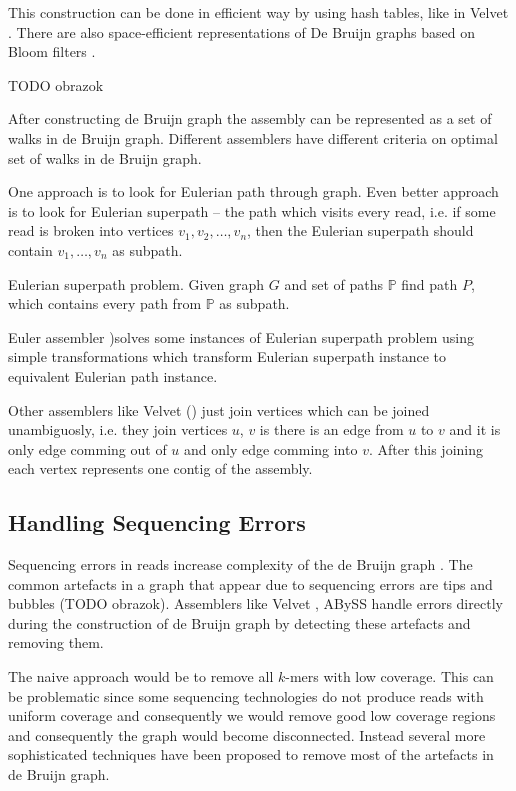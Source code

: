 This construction can be done in efficient way by using hash tables, like in Velvet \citep{Velvet}.
There are also space-efficient representations of De Bruijn graphs based on Bloom filters \citep{minia}.

TODO obrazok

After constructing de Bruijn graph the assembly can be represented
as a set of walks in de Bruijn graph. Different assemblers
have different criteria on optimal set of walks in de Bruijn graph. 

One approach is to look for Eulerian path through graph.
Even better approach is to look for
Eulerian superpath -- the path which visits every read, i.e. if some read
is broken into vertices $v_1, v_2, \dots, v_n$, then the Eulerian superpath
should contain $v_1, \dots, v_n$ as subpath.

\begin{definition}{Eulerian superpath problem.}
Given graph $G$ and set of paths $\mathbb{P}$ find path $P$, which contains
every path from $\mathbb{P}$ as subpath.
\end{definition}

Euler assembler \citep{pevzner2001eulerian})solves some instances of Eulerian superpath problem
using simple transformations which transform Eulerian superpath instance to equivalent Eulerian path instance.

Other assemblers like Velvet (\cite{Velvet}) just join vertices which can be joined
unambiguosly, i.e. they join vertices $u$, $v$ is there is an edge from $u$ to $v$ and
it is only edge comming out of $u$ and only edge comming into $v$. After this joining
each vertex represents one contig of the assembly.

\subsection{Handling Sequencing Errors}

Sequencing errors in reads increase complexity of the de Bruijn graph
\citep{pevzner2001eulerian}. The common artefacts in a graph that
appear due to sequencing errors are tips and bubbles
(TODO obrazok). Assemblers like Velvet \citep{Velvet}, ABySS \citep{Abyss} handle
errors directly during the construction of de Bruijn graph by detecting these artefacts
and removing them.

The naive approach would be to remove all $k$-mers with low coverage.
This can be problematic since some sequencing technologies do not produce reads with uniform coverage
and consequently we would remove good low coverage regions and consequently the graph would become disconnected.
Instead several more sophisticated techniques have been proposed to remove
most of the artefacts in de Bruijn graph.

